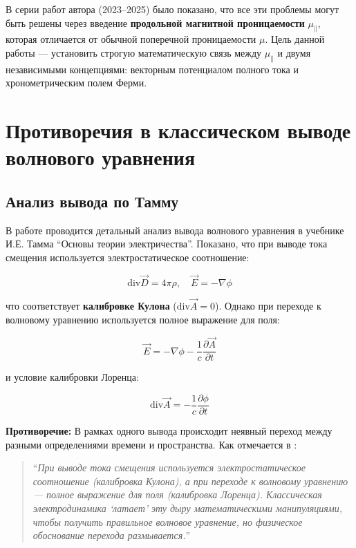 \documentclass[12pt, a4paper]{article}
\begin{document}
В серии работ автора (2023--2025) было показано, что все эти проблемы могут быть решены через введение \textbf{продольной магнитной проницаемости} $\mu_{\parallel}$, которая отличается от обычной поперечной проницаемости $\mu$. Цель данной работы --- установить строгую математическую связь между $\mu_{\parallel}$ и двумя независимыми концепциями: векторным потенциалом полного тока и хронометрическим полем Ферми.

\section{Противоречия в классическом выводе волнового уравнения}

\subsection{Анализ вывода по Тамму}

В работе \cite{JugglingCalibrations} проводится детальный анализ вывода волнового уравнения в учебнике И.Е. Тамма ``Основы теории электричества''. Показано, что при выводе тока смещения используется электростатическое соотношение:

\begin{equation}
\text{div} \vec{D} = 4\pi\rho, \quad \vec{E} = -\nabla \phi
\label{eq:coulomb_gauge}
\end{equation}

что соответствует \textbf{калибровке Кулона} ($\text{div} \vec{A} = 0$). Однако при переходе к волновому уравнению используется полное выражение для поля:

\begin{equation}
\vec{E} = -\nabla \phi - \frac{1}{c}\frac{\partial \vec{A}}{\partial t}
\label{eq:full_field}
\end{equation}

и условие калибровки Лоренца:

\begin{equation}
\text{div} \vec{A} = -\frac{1}{c}\frac{\partial \phi}{\partial t}
\label{eq:lorentz_gauge}
\end{equation}

\textbf{Противоречие:} В рамках одного вывода происходит неявный переход между разными определениями времени и пространства. Как отмечается в \cite{JugglingCalibrations}:

\begin{quote}
``\textit{При выводе тока смещения используется электростатическое соотношение (калибровка Кулона), а при переходе к волновому уравнению --- полное выражение для поля (калибровка Лоренца). Классическая электродинамика `латает' эту дыру математическими манипуляциями, чтобы получить правильное волновое уравнение, но физическое обоснование перехода размывается.}''
\end{quote}
\end{document}
